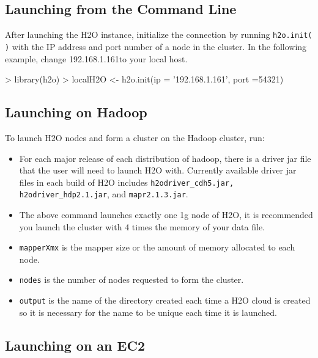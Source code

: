 \documentclass[11pt]{article}
\begin{document}
\subsection{Launching from the Command Line}

After launching the H2O instance, initialize the connection by running {\texttt{h2o.init( )}} with the IP address and port number of a node in the cluster. In the following example, change 192.168.1.161to your local host. 
\begin{spverbatim}
> library(h2o)
> localH2O <- h2o.init(ip = '192.168.1.161', port =54321)
\end{spverbatim}

\subsection{Launching on Hadoop}

To launch H2O nodes and form a cluster on the Hadoop cluster, run:

\begin{itemize}
\item For each major release of each distribution of hadoop, there is a driver jar file that the user will need to launch H2O with. Currently available driver jar files in each build of H2O includes {\texttt{h2odriver_cdh5.jar, h2odriver_hdp2.1.jar}}, and {\texttt{mapr2.1.3.jar}}.
\item The above command launches exactly one 1g node of H2O, it is recommended you launch the cluster with 4 times the memory of your data file.
\item{\texttt{mapperXmx}} is the mapper size or the amount of memory allocated to each node.
\item{\texttt{nodes}} is the number of nodes requested to form the cluster.
\item{\texttt{output}} is the name of the directory created each time a H2O cloud is created so it is necessary for the name to be unique each time it is launched.
\end{itemize}


\subsection{Launching on an EC2}
\end{document}
